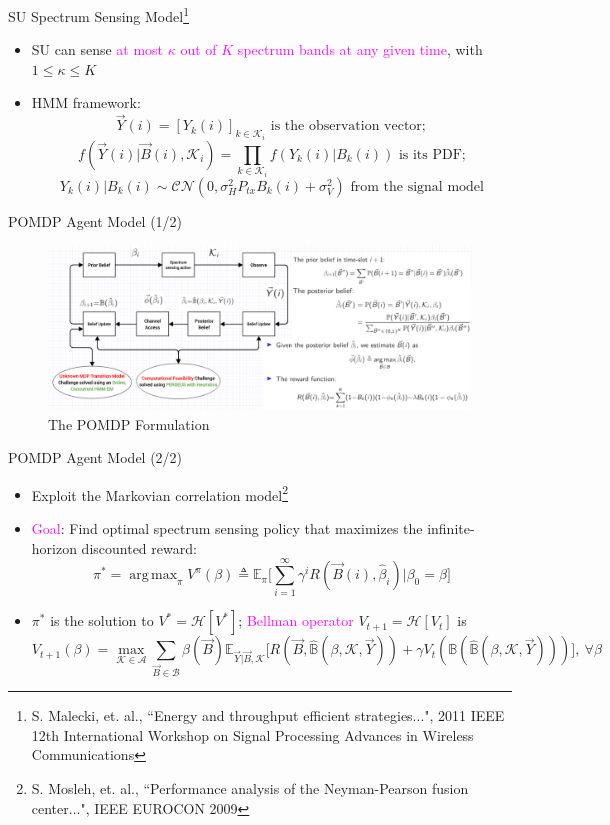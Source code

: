 \documentclass{beamer}
\DeclareMathOperator*{\argmax}{arg\,max}
\begin{document}
\begin{frame}{SU Spectrum Sensing Model\footnote{\tiny{S. Malecki, et. al., ``Energy and throughput efficient strategies...", 2011 IEEE 12th International Workshop on Signal Processing Advances in Wireless Communications}}}
    \begin{itemize}
        \item SU can sense \textcolor{magenta}{at most $\kappa$ out of $K$ spectrum bands at any given time}, with $1{\leq}\kappa{\leq}K$
        \item HMM framework:
        \[\vec{Y}(i) = [Y_k(i)]_{k {\in} \mathcal K_i}\text{ is the observation vector};\]
        \[f(\vec{Y}(i)|\vec{B}(i), \mathcal K_i) = \prod_{k \in \mathcal K_i} f(Y_k(i)|B_k(i))\text{ is its PDF;}\]
        \[Y_k(i)|B_k(i) \sim \mathcal{CN}(0, \sigma_H^2P_{tx}B_k(i) + \sigma_V^2)\text{ from the signal model}\]
    \end{itemize}
\end{frame}
\begin{frame}{POMDP Agent Model (1/2)}
   \begin{figure}
    \centering
    \includegraphics[width = 1.05\textwidth]{POMDP_Final.PNG}
    \caption{The POMDP Formulation}
    \label{fig:31}
\end{figure}
\end{frame}
\begin{frame}{POMDP Agent Model (2/2)}
    \footnotesize{\begin{itemize}
        \item Exploit the Markovian correlation model\footnote{\tiny{S. Mosleh, et. al., ``Performance analysis of the Neyman-Pearson fusion center...", IEEE EUROCON 2009}}
        \item \textcolor{magenta}{Goal}: Find optimal spectrum sensing policy that maximizes the infinite-horizon discounted reward:
        \[\pi^{*}{=}\argmax_{\pi} V^{\pi}(\beta) \triangleq \mathbb{E}_{\pi} \Big[\sum_{i=1}^{\infty} \gamma^{i} R(\vec{B}(i), \hat{\beta}_i)|\beta_0 {=}\beta\Big]\]
        \item $\pi^{*}$ is the solution to $V^*{=}\mathcal{H}[V^*]$; \textcolor{magenta}{Bellman operator} $V_{t+1}{=}\mathcal {H}[V_{t}]$ is
        \[V_{t+1}(\beta) = \max_{\mathcal{K} {\in} \mathcal{A}} \sum_{\vec{B} {\in} \mathcal{B}} \beta(\vec{B}) \mathbb{E}_{\vec{Y}|\vec{B}, \mathcal{K}} \Big[R(\vec{B}, \hat{\mathbb{B}}(\beta, \mathcal{K}, \vec{Y}))+\gamma V_{t}(\mathbb{B}(\hat{\mathbb{B}}(\beta, \mathcal{K}, \vec{Y})))\Big],\ \forall \beta\]
    \end{itemize}}
\end{frame}
\end{document}
